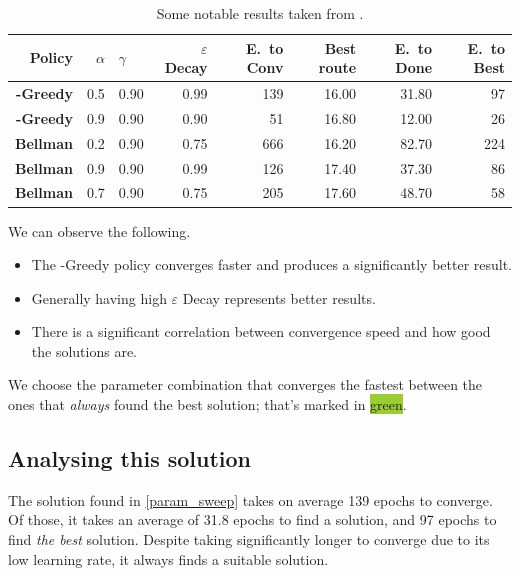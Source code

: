 \begin{table}[h]
	\scriptsize
	\centering
	\begin{tabular}{>{\bfseries}r r l r | r r r r}
		\toprule
		Policy & $\alpha$ & $\gamma$ & $\varepsilon$ Decay &
		E.\ to Conv & Best route & E.\ to Done & E.\ to Best \\
		\midrule
		\rowcolor{YellowGreen}
		\textepsilon{}-Greedy & 0.5  & 0.90  & 0.99 & 139 & 16.00 & 31.80  & 97 \\
		\textepsilon{}-Greedy & 0.9 & 0.90  & 0.90 & 51  & 16.80 & 12.00  & 26 \\
		\midrule
		Bellman & 0.2 & 0.90 & 0.75 & 666  & 16.20 &  82.70 &  224 \\
		Bellman & 0.9 & 0.90 & 0.99 & 126  & 17.40 &  37.30 &   86 \\
		Bellman & 0.7 & 0.90 & 0.75 & 205  & 17.60 &  48.70 &   58 \\
		\bottomrule
	\end{tabular}
	\caption{Some notable results taken from \appendixA{}.}
	\label{param_sweep_interesting}
\end{table}

We can observe the following.
\begin{itemize}
	\item The \textepsilon{}-Greedy policy converges faster and produces a significantly better result.
	\item Generally having high $\varepsilon$ Decay represents better results.
	\item There is a significant correlation between convergence speed and how good the solutions are.
\end{itemize}

We choose the parameter combination that converges the fastest between the ones that \emph{always} found the best solution; that's marked in \colorbox{YellowGreen}{green}.

\subsection{Analysing this solution}
The solution found in \cref{param_sweep} takes on average 139 epochs to converge.
Of those, it takes an average of 31.8 epochs to find a solution, and 97 epochs to find \emph{the best} solution.
Despite taking significantly longer to converge due to its low learning rate, it always finds a suitable solution.

